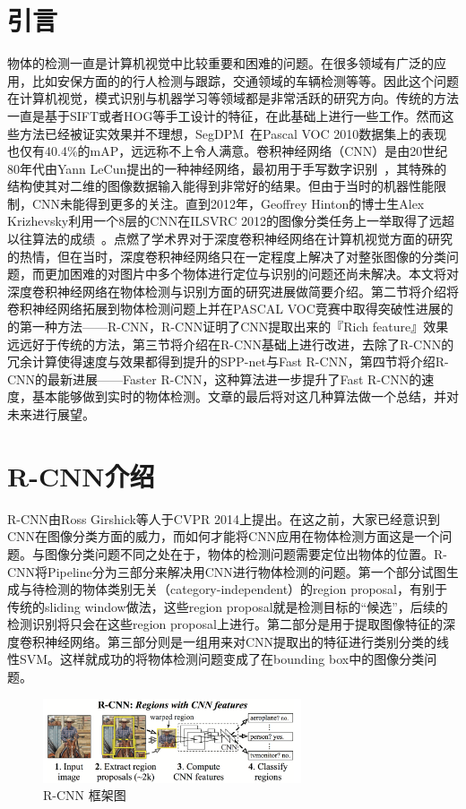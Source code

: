 \documentclass[10pt,twocolumn,letterpaper]{article}
\begin{document}
\section{引言}
物体的检测一直是计算机视觉中比较重要和困难的问题。在很多领域有广泛的应用，比如安保方面的的行人检测与跟踪，交通领域的车辆检测等等。因此这个问题在计算机视觉，模式识别与机器学习等领域都是非常活跃的研究方向。传统的方法一直是基于SIFT或者HOG等手工设计的特征，在此基础上进行一些工作。然而这些方法已经被证实效果并不理想，SegDPM~\cite{fidler2013bottom}在Pascal VOC 2010数据集上的表现也仅有40.4\%的mAP，远远称不上令人满意。卷积神经网络（CNN）是由20世纪80年代由Yann LeCun提出的一种神经网络，最初用于手写数字识别~\cite{lecun1989backpropagation}，其特殊的结构使其对二维的图像数据输入能得到非常好的结果。但由于当时的机器性能限制，CNN未能得到更多的关注。直到2012年，Geoffrey Hinton的博士生Alex Krizhevsky利用一个8层的CNN在ILSVRC 2012的图像分类任务上一举取得了远超以往算法的成绩~\cite{krizhevsky2012imagenet}。点燃了学术界对于深度卷积神经网络在计算机视觉方面的研究的热情，但在当时，深度卷积神经网络只在一定程度上解决了对整张图像的分类问题，而更加困难的对图片中多个物体进行定位与识别的问题还尚未解决。本文将对深度卷积神经网络在物体检测与识别方面的研究进展做简要介绍。第二节将介绍将卷积神经网络拓展到物体检测问题上并在PASCAL VOC竞赛中取得突破性进展的的第一种方法——R-CNN，R-CNN证明了CNN提取出来的『Rich feature』效果远远好于传统的方法，第三节将介绍在R-CNN基础上进行改进，去除了R-CNN的冗余计算使得速度与效果都得到提升的SPP-net与Fast R-CNN，第四节将介绍R-CNN的最新进展——Faster R-CNN，这种算法进一步提升了Fast R-CNN的速度，基本能够做到实时的物体检测。文章的最后将对这几种算法做一个总结，并对未来进行展望。

\section{R-CNN介绍}
R-CNN由Ross Girshick等人于CVPR 2014上提出。在这之前，大家已经意识到CNN在图像分类方面的威力，而如何才能将CNN应用在物体检测方面这是一个问题。与图像分类问题不同之处在于，物体的检测问题需要定位出物体的位置。R-CNN将Pipeline分为三部分来解决用CNN进行物体检测的问题。第一个部分试图生成与待检测的物体类别无关（category-independent）的region proposal，有别于传统的sliding window做法，这些region proposal就是检测目标的“候选”，后续的检测识别将只会在这些region proposal上进行。第二部分是用于提取图像特征的深度卷积神经网络。第三部分则是一组用来对CNN提取出的特征进行类别分类的线性SVM。这样就成功的将物体检测问题变成了在bounding box中的图像分类问题。
\begin{figure}[htbp] %
   \centering
   \includegraphics[width=3in]{rcnn.png} 
   \caption{R-CNN 框架图}
   \label{figure:rcnn}
\end{figure}
\end{document}
